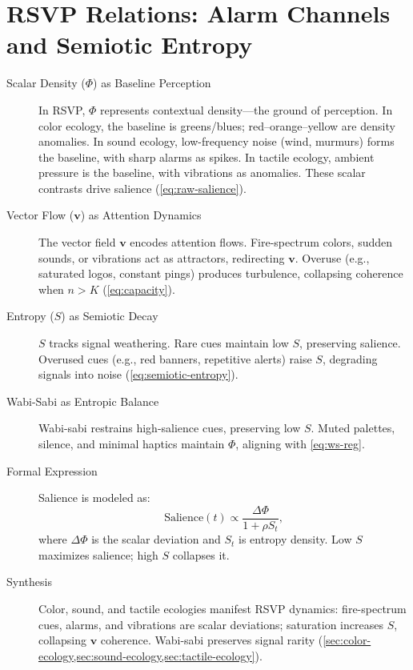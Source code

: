 \documentclass[openany]{book}
\newcommand{\PhiS}{\Phi} %
\newcommand{\vvec}{\mathbf{v}} %
\newcommand{\Sent}{S} %
\begin{document}
\section{RSVP Relations: Alarm Channels and Semiotic Entropy}
\label{sec:rsvp-relations}
\begin{description}
  \item[Scalar Density (\(\PhiS\)) as Baseline Perception] In RSVP, \(\PhiS\) represents contextual density---the ground of perception. In color ecology, the baseline is greens/blues; red--orange--yellow are density anomalies. In sound ecology, low-frequency noise (wind, murmurs) forms the baseline, with sharp alarms as spikes. In tactile ecology, ambient pressure is the baseline, with vibrations as anomalies. These scalar contrasts drive salience (\cref{eq:raw-salience}).
  \item[Vector Flow (\(\vvec\)) as Attention Dynamics] The vector field \(\vvec\) encodes attention flows. Fire-spectrum colors, sudden sounds, or vibrations act as attractors, redirecting \(\vvec\). Overuse (e.g., saturated logos, constant pings) produces turbulence, collapsing coherence when $n > K$ (\cref{eq:capacity}).
  \item[Entropy (\(\Sent\)) as Semiotic Decay] \(\Sent\) tracks signal weathering. Rare cues maintain low $\Sent$, preserving salience. Overused cues (e.g., red banners, repetitive alerts) raise $\Sent$, degrading signals into noise (\cref{eq:semiotic-entropy}).
  \item[Wabi-Sabi as Entropic Balance] Wabi-sabi restrains high-salience cues, preserving low $\Sent$. Muted palettes, silence, and minimal haptics maintain \(\PhiS\), aligning with \eqref{eq:ws-reg}.
  \item[Formal Expression] Salience is modeled as:
  \begin{equation}
  \label{eq:salience}
  \text{Salience}(t) \propto \frac{\Delta \PhiS}{1 + \rho \Sent_t},
  \end{equation}
  where $\Delta \PhiS$ is the scalar deviation and $\Sent_t$ is entropy density. Low $\Sent$ maximizes salience; high $\Sent$ collapses it.
  \item[Synthesis] Color, sound, and tactile ecologies manifest RSVP dynamics: fire-spectrum cues, alarms, and vibrations are scalar deviations; saturation increases $\Sent$, collapsing \(\vvec\) coherence. Wabi-sabi preserves signal rarity (\cref{sec:color-ecology,sec:sound-ecology,sec:tactile-ecology}).
\end{description}
\end{document}
